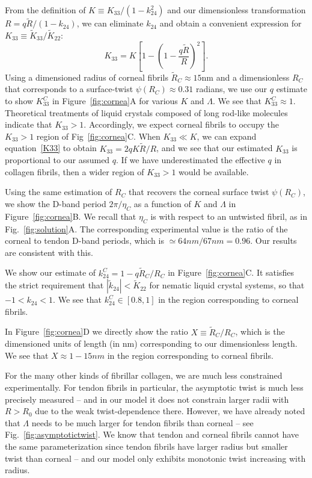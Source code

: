 \documentclass[twoside,twocolumn,9pt]{article}
\begin{document}
From the definition of $K \equiv K_{33}/(1-k_{24}^2)$ and our dimensionless transformation $R=q \tilde{R}/(1-k_{24})$, we can eliminate $k_{24}$ and obtain a convenient expression for $K_{33}\equiv \tilde{K}_{33}/\tilde{K}_{22}$:
\begin{equation}
    K_{33} = K \left[ 1 - \left(1 - \frac{q \tilde{R}}{R} \right)^2 \right].
    \label{K33}
\end{equation}
Using a dimensioned radius of corneal fibrils $\tilde{R}_C \approx 15$nm and a dimensionless $R_C$ that corresponds to a surface-twist $\psi(R_C) \approx 0.31$ radians, we use our $q$ estimate to show $K_{33}^C$
in Figure~\ref{fig:cornea}A for various $K$ and $\Lambda$. We see that $K_{33}^C \approx 1$. Theoretical treatments of liquid crystals composed of long rod-like molecules indicate that $K_{33}>1$.\cite{Strayley:1973, Ferrarini:2010} Accordingly, we expect corneal fibrils to occupy the $K_{33}>1$ region of Fig~\ref{fig:cornea}C.  When  $K_{33} \ll K$, we can expand equation~\ref{K33} to obtain $K_{33} = 2q K \tilde{R}/R$, and we see that our estimated $K_{33}$ is proportional to our assumed $q$. If we have underestimated the effective $q$ in collagen fibrils, then a wider region of $K_{33}>1$ would be available.  

Using the same estimation of $R_C$ that recovers the corneal surface twist $\psi(R_C)$, we show the D-band period $2 \pi/\eta_C$ as a function of $K$ and $\Lambda$ in Figure~\ref{fig:cornea}B. We recall that $\eta_C$ is with respect to an untwisted fibril, as in Fig.~\ref{fig:solution}A. The corresponding experimental value is the ratio of the corneal to tendon D-band periods, which is $\simeq 64 nm/67nm= 0.96$.\cite{Raspanti:2018} Our results are consistent with this.

We show our estimate of $k_{24}^C = 1 -q \tilde{R}_C/R_C$ in Figure~\ref{fig:cornea}C. It satisfies the strict requirement that $|\tilde{k}_{24}| < \tilde{K}_{22}$ for nematic liquid crystal systems, so that $-1 < k_{24} < 1$.\cite{Ericksen:1991} We see that $k_{24}^C \in[0.8,1]$ in the region corresponding to corneal fibrils.

In Figure~\ref{fig:cornea}D we directly show the ratio $X \equiv \tilde{R}_C/R_C$, which is the dimensioned units of length (in nm) corresponding to our dimensionless length. We see that $X \approx 1-15 nm$ in the region corresponding to corneal fibrils.

For the many other kinds of fibrillar collagen, we are much less constrained experimentally. For tendon fibrils in particular, the asymptotic twist is much less precisely measured -- and in our model it does not constrain larger radii with $R > R_0$ due to the weak twist-dependence there.  However, we have already noted that $\Lambda$ needs to be much larger for tendon fibrils than corneal -- see Fig.~\ref{fig:asymptotictwist}. We know that tendon and corneal fibrils cannot have the same parameterization since tendon fibrils have larger radius but smaller twist than corneal -- and our model only exhibits monotonic twist increasing with radius.
\end{document}
